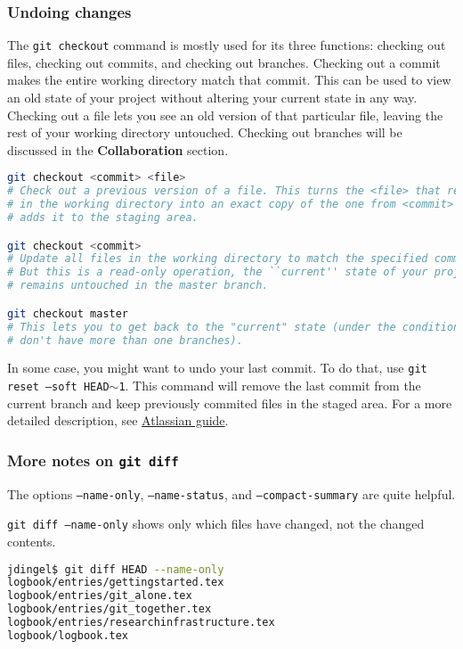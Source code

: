 \subsubsection{Undoing changes}
The \texttt{git checkout} command is mostly used for its three functions:
checking out files, checking out commits, and checking out branches.
Checking out a commit makes the entire working directory match that commit.
This can be used to view an old state of your project without altering your current state in any way.
Checking out a file lets you see an old version of that particular file, leaving the rest of your working directory untouched.
Checking out branches will be discussed in the \textbf{Collaboration} section.
\\
\begin{lstlisting}[language=bash]
git checkout <commit> <file>
# Check out a previous version of a file. This turns the <file> that resides
# in the working directory into an exact copy of the one from <commit> and
# adds it to the staging area.

git checkout <commit>
# Update all files in the working directory to match the specified commit.
# But this is a read-only operation, the ``current'' state of your project
# remains untouched in the master branch.

git checkout master
# This lets you to get back to the "current" state (under the condition you
# don't have more than one branches).
\end{lstlisting}

In some case, you might want to undo your last commit.
To do that, use \texttt{git reset --soft HEAD\texttt{$\sim$}1}.
This command will remove the last commit from the current branch and keep previously commited files in the staged area.
For a more detailed description, see \href{https://www.atlassian.com/git/tutorials/undoing-changes/git-reset}{Atlassian guide}.

\subsubsection{More notes on \texttt{git diff}}
The options \texttt{--name-only}, \texttt{--name-status}, and \texttt{--compact-summary} are quite helpful.

\texttt{git diff --name-only} shows only which files have changed, not the changed contents.
\begin{lstlisting}[language=bash]
jdingel$ git diff HEAD --name-only
logbook/entries/gettingstarted.tex
logbook/entries/git_alone.tex
logbook/entries/git_together.tex
logbook/entries/researchinfrastructure.tex
logbook/logbook.tex
\end{lstlisting}

